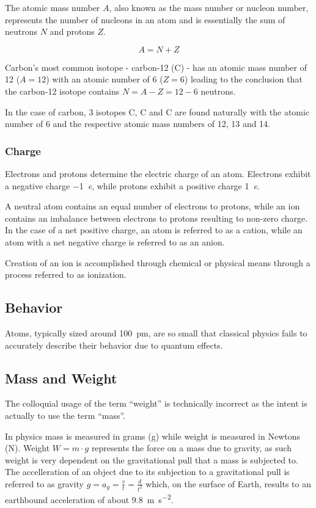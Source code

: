 The atomic mass number $A$, also known as the mass number or nucleon number,
represents the number of nucleons in an atom and is essentially the sum of
neutrons $N$ and protons $Z$.

$$A = N + Z$$

Carbon's most common isotope -  carbon-12 (C) - has an
atomic mass number of 12 ($A = 12$) with an atomic number of 6 ($Z = 6$)
leading to the conclusion that the carbon-12 isotope contains $N=A-Z=12-6$
neutrons.

In the case of carbon, 3 isotopes C, C and
C are found naturally with the atomic number of 6 and the
respective atomic mass numbers of 12, 13 and 14.

\subsubsection{Charge}

Electrons and protons determine the electric charge of an atom. Electrons
exhibit a negative charge \SI{-1}{\elementarycharge}, while protons exhibit a
positive charge \SI{1}{\elementarycharge}.

A neutral atom contains an equal number of electrons to protons, while an ion
contains an imbalance between electrons to protons resulting to non-zero charge.
In the case of a net positive charge, an atom is referred to as a
cation, while an atom with a net negative charge is referred to
as an anion.

Creation of an ion is accomplished through chemical or physical means through
a process referred to as ionization.

\subsection{Behavior}
Atoms, typically sized around \SI{100}{\pico\meter}, are so small that
classical physics fails to accurately describe their behavior due to quantum
effects.

\subsection{Mass and Weight}
The colloquial usage of the term ``weight'' is technically incorrect as the
intent is actually to use the term ``mass''.

In physics mass is measured in grams (\si{\gram}) while weight is measured in
Newtons (\si{\newton}).
Weight $W = m\cdot g$ represents the force on a mass due to
gravity, as such weight is very dependent on the gravitational pull that a
mass is subjected to.
The accelleration of an object due to its subjection to a gravitational pull is
referred to as gravity $g = a_g = \frac{v}{t} = \frac{d}{t^2}$
which, on the surface of Earth, results to an earthbound acceleration of about
\SI{9.8}{\meter\second^{-2}}.

